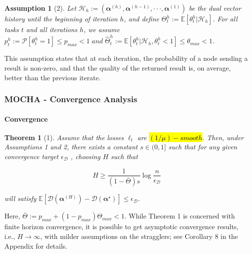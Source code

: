 \documentclass[UTF8,aspectratio=169,presentation]{ctexbeamer}
\makeatletter
\let\HL\hl
\renewcommand\hl{%
  \let\set@color\beamerorig@set@color
  \let\reset@color\beamerorig@reset@color
  \HL}
\newtheorem{assumption}{Assumption}
\newtheorem{mytheorem}{Theorem}
\makeatother
\begin{document}
\begin{frame}
  \begin{assumption}[2]
  Let $\mathcal H_h := (\boldsymbol\alpha^{(h)},\boldsymbol\alpha^{(h−1)},···,\boldsymbol\alpha^{(1)})$ be the dual vector history until the beginning of iteration $h$, and define $\Theta^h_t := \mathbb E[\theta^h_t|\mathcal H_h]$.  For all tasks $t$ and all iterations $h$, we assume $p^h_t:=\mathcal P[\theta^h_t= 1] \leq p_{max} < 1  \; and  \;  \hat{\Theta}^h_t:= \mathbb E[\theta^h_t| \mathcal H_h,\theta^h_t< 1] \leq \theta_{max} < 1$.
\end{assumption}

This assumption states that at each iteration, the probability of a node sending a result is non-zero, and that the quality of the returned result is, on average, better than the previous iterate.
\end{frame}


\begin{frame}[t]
  \frametitle{MOCHA - Convergence Analysis}
  \framesubtitle{Convergence}

  \begin{mytheorem}[1]
    
    Assume that the losses $\ell_t$ are \hl{$(1/\mu)-smooth$}. Then, under Assumptions 1 and 2, there
    exists a constant $s \in (0, 1]$ such that for any given convergence target $\epsilon_{\mathcal D}$ , choosing $H$ such that

$$
H \geq \frac{1}{(1-\bar{\Theta}) s} \log \frac{n}{\epsilon_{\mathcal{D}}}
$$

will satisfy $
\mathbb{E}\left[\mathcal{D}\left(\boldsymbol{\alpha}^{(H)}\right)-\mathcal{D}\left(\boldsymbol{\alpha}^{\star}\right)\right] \leq \epsilon_{\mathcal{D}}
$.
  \end{mytheorem}

  Here, $\bar\Theta := p_{max} + (1 − p_{max} ) \Theta_{max} < 1$. While Theorem 1 is concerned with finite horizon convergence, it is possible to get asymptotic convergence results, i.e., $H \rightarrow \infty$, with milder assumptions on
the stragglers; see Corollary 8 in the Appendix for details.
\end{frame}
\end{document}
